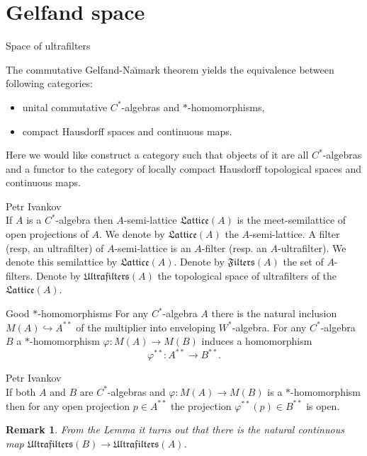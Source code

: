 \documentclass{beamer}
\theoremstyle{plain}
\newtheorem{rem}{Remark}
\newcommand{\be}{\begin{equation}}
\newcommand{\ee}{\end{equation}}
\newcommand{\hookto}{\hookrightarrow}        %
\begin{document}
\section{Gelfand space}
\begin{frame}
			{\Large Space of ultrafilters}
	
The commutative  Gelfand-Na\u{\i}mark  theorem yields the equivalence between  following categories:
\begin{itemize}
	\item  unital commutative $C^*$-algebras and $*$-homomorphisms,
	\item compact Hausdorff  spaces and continuous maps.
\end{itemize} 
Here we would like construct a category such that objects of it are all $C^*$-algebras and a functor to the category of locally compact Hausdorff topological  spaces  and continuous maps.
\begin{definition}\alert{Petr Ivankov}\\
	If $A$ is a $C^*$-algebra then $A$-\alert{semi-lattice} $\mathfrak{Lattice}\left( A\right)$ is the meet-semilattice  of open projections of  $A$. We denote by  $\mathfrak{Lattice}\left( A\right)$ the $A$-{semi}-{lattice}.
	A filter (resp, an ultrafilter) of $A$-semi-lattice is an $A$-\alert{filter} (resp. an $A$-\alert{ultrafilter}).	We denote this semilattice by $\mathfrak{Lattice}\left( A\right)$. Denote by $\mathfrak{Filters}\left( A\right)$   the  set of $A$-filters. Denote by $\mathfrak{Ultrafilters}\left( A\right)$ the topological space of ultrafilters of the $\mathfrak{Lattice}\left( A\right)$. 
\end{definition}

\end{frame}
	\begin{frame}
				{\Large Good $*$-homomorphisms}
		For any $C^*$-algebra $A$ there is the natural inclusion $M\left(A \right)  \hookto A^{**}$ of the multiplier into enveloping $W^*$-algebra. For any $C^*$-algebra $B$ a $*$-homomorphism $\varphi :M\left(A \right) \to M\left(B \right)$ induces a homomorphism
		\be\label{w*_eqn} 
		\varphi^{**} : A^{**} \to B^{**}.
		\ee 
		\begin{lemma}\alert{Petr Ivankov}\\
			If both $A$ and $B$ are $C^*$-algebras  and  $\varphi : M\left(  A\right)  \to M\left( B\right) $ is a $*$-homomorphism then for any open projection $p \in A^{**}$  the projection $\varphi^{**}\left( p\right) \in  B^{**}$ is open.
		\end{lemma}
		\begin{rem}
			From the Lemma it turns out that there is the natural continuous map $\mathfrak{Ultrafilters}\left(B\right)\to \mathfrak{Ultrafilters}\left(A \right)$.
		\end{rem}
		
\end{frame}
\end{document}

